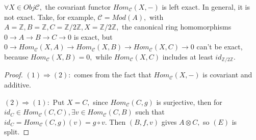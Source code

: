 \begin{remark}
$\forall X\in Obj\mathscr{C},$ the covariant functor
$Hom_{\mathscr{C}}(X,-)$ is left exact. In general, it is not exact.
Take, for example, $\mathscr{C}=Mod(A),$ with $A=\mathbb{Z},
B=\mathbb{Z}, C=\mathbb{Z}/2\mathbb{Z}, X=\mathbb{Z}/2\mathbb{Z},$
the canonical ring homomorphisms $0 \rightarrow A\rightarrow
B\rightarrow C\rightarrow 0$ is exact, but $0 \rightarrow
Hom_{\mathscr{C}}(X,A)\rightarrow Hom_{\mathscr{C}}(X,B)\rightarrow
Hom_{\mathscr{C}}(X,C)\rightarrow 0$ can't be exact, because
$Hom_{\mathscr{C}}(X,B)=0,$ while $Hom_{\mathscr{C}}(X,C)$ includes
at least $id_{\mathbb{Z}/2\mathbb{Z}}.$
\end{remark}
\begin{proof}
$(1)\Longrightarrow(2):$ comes from the fact that
$Hom_{\mathscr{C}}(X,-)$ is covariant and additive.

$(2)\Longrightarrow(1):$ Put $X=C,$ since $Hom_{\mathscr{C}}(C,g)$
is surjective, then for $id_C\in Hom_{\mathscr{C}}(C,C), \exists
v\in Hom_{\mathscr{C}}(C,B)$ such that
$id_C=Hom_{\mathscr{C}}(C,g)(v)=g\circ v.$ Then $(B,f,v)$ gives
$A\otimes C,$ so $(E)$ is split.
\end{proof}
